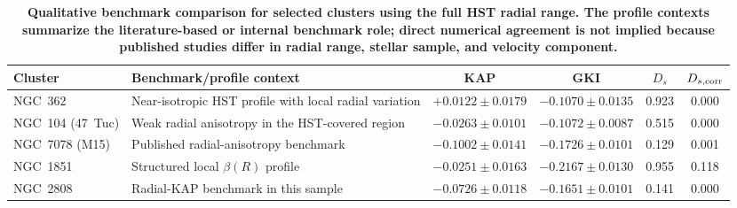 \begin{table}
\centering
\caption{\textbf{Qualitative benchmark comparison for selected clusters using the full HST radial range. The profile contexts summarize the literature-based or internal benchmark role; direct numerical agreement is not implied because published studies differ in radial range, stellar sample, and velocity component.}}
\label{tab:literature}
\small
\setlength{\tabcolsep}{4pt}
\begin{tabular}{lp{}cccc}
\hline
Cluster & Benchmark/profile context & KAP & GKI & $D_s$ & $D_{s,\rm corr}$ \\
\hline
NGC~362 & Near-isotropic HST profile with local radial variation & $+0.0122\pm0.0179$ & $-0.1070\pm0.0135$ & 0.923 & 0.000 \\
NGC~104 (47~Tuc) & Weak radial anisotropy in the HST-covered region & $-0.0263\pm0.0101$ & $-0.1072\pm0.0087$ & 0.515 & 0.000 \\
NGC~7078 (M15) & Published radial-anisotropy benchmark & $-0.1002\pm0.0141$ & $-0.1726\pm0.0101$ & 0.129 & 0.001 \\
NGC~1851 & Structured local $\beta(R)$ profile & $-0.0251\pm0.0163$ & $-0.2167\pm0.0130$ & 0.955 & 0.118 \\
NGC~2808 & Radial-KAP benchmark in this sample & $-0.0726\pm0.0118$ & $-0.1651\pm0.0101$ & 0.141 & 0.000 \\
\hline
\end{tabular}
\end{table}